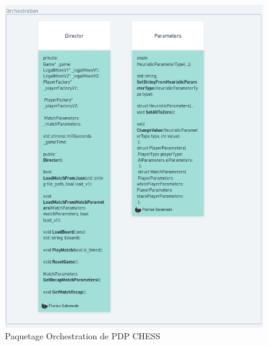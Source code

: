 \documentclass{article}
\begin{document}
\begin{figure}[!h]
    \centering
    \includegraphics[scale = 0.3]{img/Package/Orchestration.png}
    \caption{Paquetage Orchestration de PDP CHESS}
    \label{pck:orchestration}
\end{figure}
\newpage
\end{document}
